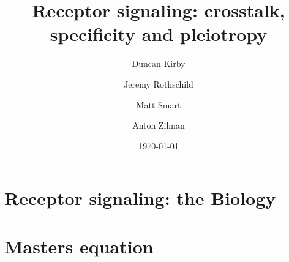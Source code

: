 \documentclass[aip, jmp, amsmath,amssymb, preprint, reprint, author-year,%
]{revtex4-1}
\begin{document}

\title[Receptor signaling dynamics]{Receptor signaling: crosstalk, specificity and pleiotropy}%
\author{Duncan Kirby}
\author{Jeremy Rothschild}
\author{Matt Smart}
\author{Anton Zilman}%


\date{\today}%



\maketitle



\section{\label{sec:bio}Receptor signaling: the Biology}


\section{\label{sec:model}Masters equation}








%
\end{document}
